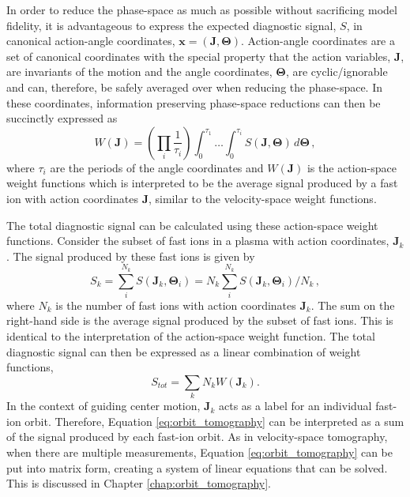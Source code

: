 In order to reduce the phase-space as much as possible without sacrificing model fidelity, it is advantageous to express the expected diagnostic signal, $S$, in canonical action-angle coordinates, $\mathbf{x} = (\mathbf{J},\mathbf{\Theta})$.
Action-angle coordinates are a set of canonical coordinates with the special property that the action variables, $\mathbf{J}$, are invariants of the motion and the angle coordinates, $\mathbf{\Theta}$, are cyclic/ignorable and can, therefore, be safely averaged over when reducing the phase-space. 
In these coordinates, information preserving phase-space reductions can then be succinctly expressed as
\begin{equation}\label{eq:action_angle_reduction}
    W(\mathbf{J}) = \left( \prod_i \frac{1}{\tau_i} \right) \int_0^{\tau_1}\ldots\int_0^{\tau_i} S(\mathbf{J},\mathbf{\Theta})\, d\mathbf{\Theta}\,,
\end{equation}
where $\tau_i$ are the periods of the angle coordinates and $W(\mathbf{J})$ is the action-space weight functions which is interpreted to be the average signal produced by a fast ion with action coordinates $\mathbf{J}$, similar to the velocity-space weight functions. 

The total diagnostic signal can be calculated using these action-space weight functions. Consider the subset of fast ions in a plasma with action coordinates, $\mathbf{J}_k$.
The signal produced by these fast ions is given by
\begin{equation}\label{eq:orbit_tomography_discrete}
    S_k = \sum_i^{N_k} S(\mathbf{J}_k,\mathbf{\Theta}_i) = N_k \sum_i^{N_k} S(\mathbf{J}_k,\mathbf{\Theta}_i)/N_k\,,
\end{equation}
where $N_k$ is the number of fast ions with action coordinates $\mathbf{J}_k$.
The sum on the right-hand side is the average signal produced by the subset of fast ions. This is identical to the interpretation of the action-space weight function.
The total diagnostic signal can then be expressed as a linear combination of weight functions,
\begin{equation}\label{eq:orbit_tomography}
    S_{tot} = \sum_k N_k W(\mathbf{J}_k) .
\end{equation}
In the context of guiding center motion, $\mathbf{J}_k$ acts as a label for an individual fast-ion orbit. Therefore, Equation \ref{eq:orbit_tomography} can be interpreted as a sum of the signal produced by each fast-ion orbit.
As in velocity-space tomography, when there are multiple measurements, Equation \ref{eq:orbit_tomography} can be put into matrix form, creating a system of linear equations that can be solved. This is discussed in Chapter \ref{chap:orbit_tomography}.

